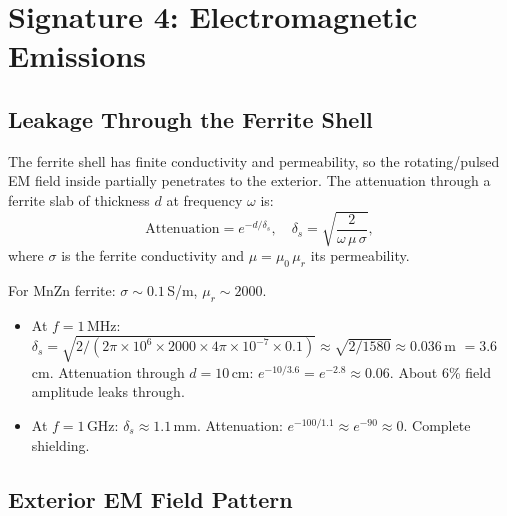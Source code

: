\documentclass[11pt]{article}
\begin{document}
\section{Signature 4: Electromagnetic Emissions}\label{sec:em}

\subsection{Leakage Through the Ferrite Shell}

The ferrite shell has finite conductivity and permeability, so the
rotating/pulsed EM field inside partially penetrates to the exterior.
The attenuation through a ferrite slab of thickness $d$ at frequency
$\omega$ is:
\begin{equation}\label{eq:skin-depth}
\text{Attenuation} = e^{-d/\delta_s}, \quad
\delta_s = \sqrt{\frac{2}{\omega\,\mu\,\sigma}},
\end{equation}
where $\sigma$ is the ferrite conductivity and $\mu = \mu_0\,\mu_r$ its
permeability.

For MnZn ferrite: $\sigma \sim 0.1$\,S/m, $\mu_r \sim 2000$.

\begin{itemize}
\item At $f = 1$\,MHz:
  $\delta_s = \sqrt{2/(2\pi \times 10^6 \times 2000 \times 4\pi \times 10^{-7}
  \times 0.1)} \approx \sqrt{2/1580} \approx 0.036$\,m $= 3.6$\,cm.
  Attenuation through $d = 10$\,cm: $e^{-10/3.6} = e^{-2.8} \approx 0.06$.
  About 6\% field amplitude leaks through.

\item At $f = 1$\,GHz:
  $\delta_s \approx 1.1$\,mm. Attenuation: $e^{-100/1.1} \approx e^{-90}
  \approx 0$. Complete shielding.
\end{itemize}

\subsection{Exterior EM Field Pattern}
\end{document}
